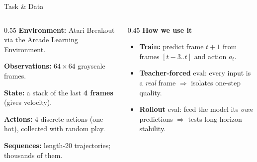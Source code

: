 \documentclass[aspectratio=169]{beamer}
\begin{document}
\begin{frame}{Task \& Data}
  \begin{columns}
    \begin{column}{0.55\textwidth}
      \textbf{Environment:} Atari Breakout via the Arcade Learning Environment.

      \vspace{0.4em}
      \textbf{Observations:} $64\times64$ grayscale frames.

      \vspace{0.4em}
      \textbf{State:} a stack of the last \textbf{4 frames} (gives velocity).

      \vspace{0.4em}
      \textbf{Actions:} 4 discrete actions (one-hot), collected with random play.

      \vspace{0.4em}
      \textbf{Sequences:} length-20 trajectories; thousands of them.
    \end{column}
    \begin{column}{0.45\textwidth}
      \textbf{How we use it}
      \begin{itemize}
        \item \textbf{Train:} predict frame $t{+}1$ from frames $[t{-}3..t]$ and
              action $a_t$.
        \item \textbf{Teacher-forced} eval: every input is a \emph{real} frame
              $\Rightarrow$ isolates one-step quality.
        \item \textbf{Rollout} eval: feed the model its \emph{own} predictions
              $\Rightarrow$ tests long-horizon stability.
      \end{itemize}
    \end{column}
  \end{columns}
\end{frame}
\end{document}
